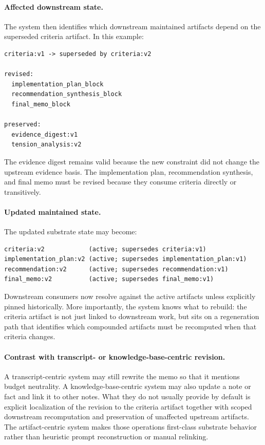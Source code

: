 \documentclass{article}
\begin{document}
\paragraph{Affected downstream state.} The system then identifies which downstream maintained artifacts depend on the superseded criteria artifact. In this example:

\begin{verbatim}
criteria:v1 -> superseded by criteria:v2

revised:
  implementation_plan_block
  recommendation_synthesis_block
  final_memo_block

preserved:
  evidence_digest:v1
  tension_analysis:v2
\end{verbatim}

The evidence digest remains valid because the new constraint did not change the upstream evidence basis. The implementation plan, recommendation synthesis, and final memo must be revised because they consume criteria directly or transitively.

\paragraph{Updated maintained state.} The updated substrate state may become:

\begin{verbatim}
criteria:v2            (active; supersedes criteria:v1)
implementation_plan:v2 (active; supersedes implementation_plan:v1)
recommendation:v2      (active; supersedes recommendation:v1)
final_memo:v2          (active; supersedes final_memo:v1)
\end{verbatim}

Downstream consumers now resolve against the active artifacts unless explicitly pinned historically. More importantly, the system knows what to rebuild: the criteria artifact is not just linked to downstream work, but sits on a regeneration path that identifies which compounded artifacts must be recomputed when that criteria changes.

\paragraph{Contrast with transcript- or knowledge-base-centric revision.} A transcript-centric system may still rewrite the memo so that it mentions budget neutrality. A knowledge-base-centric system may also update a note or fact and link it to other notes. What they do not usually provide by default is explicit localization of the revision to the criteria artifact together with scoped downstream recomputation and preservation of unaffected upstream artifacts. The artifact-centric system makes those operations first-class substrate behavior rather than heuristic prompt reconstruction or manual relinking.
\end{document}
